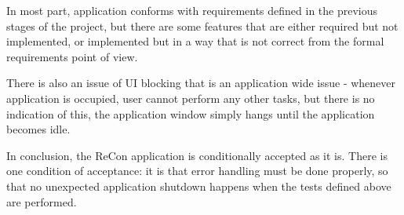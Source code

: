 \documentclass{article}
\begin{document}
In most part, application conforms with requirements defined in the previous stages of the project,
but there are some features that are either required but not implemented, or implemented but in a
way that is not correct from the formal requirements point of view. 

There is also an issue of UI blocking that is an application wide issue - whenever application is
occupied, user cannot perform any other tasks, but there is no indication of this, the application
window simply hangs until the application becomes idle.

In conclusion, the ReCon application is conditionally accepted as it is. There is one condition of
acceptance: it is that error handling must be done properly, so that no unexpected application
shutdown happens when the tests defined above are performed.
\end{document}
